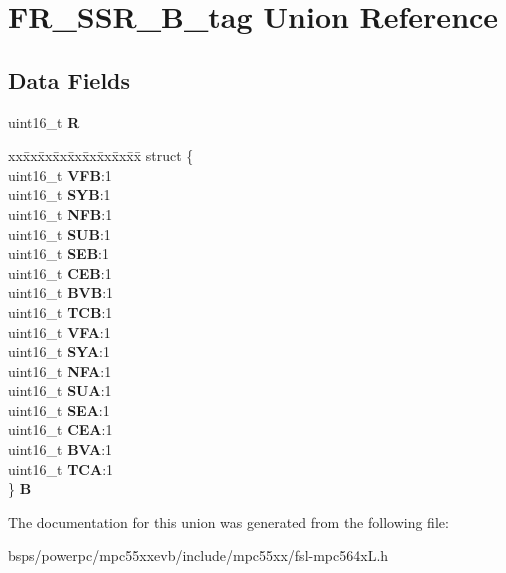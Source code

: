 \hypertarget{unionFR__SSR__16B__tag}{}\section{F\+R\+\_\+\+S\+S\+R\+\_\+B\+\_\+tag Union Reference}
\label{unionFR__SSR__16B__tag}
\subsection*{Data Fields}
\begin{DoxyCompactItemize}
\item 
\mbox{\label{unionFR__SSR__16B__tag_a00888d710880e02af1002a7a520a14ed}} 
uint16\+\_\+t {\bfseries R}
\item 
\mbox{\label{unionFR__SSR__16B__tag_a0a9411fcb2dc6e083cb123cf03e1525c}} 
\begin{tabbing}
xx\=xx\=xx\=xx\=xx\=xx\=xx\=xx\=xx\=\kill
struct \{\\
\>uint16\_t {\bfseries VFB}:1\\
\>uint16\_t {\bfseries SYB}:1\\
\>uint16\_t {\bfseries NFB}:1\\
\>uint16\_t {\bfseries SUB}:1\\
\>uint16\_t {\bfseries SEB}:1\\
\>uint16\_t {\bfseries CEB}:1\\
\>uint16\_t {\bfseries BVB}:1\\
\>uint16\_t {\bfseries TCB}:1\\
\>uint16\_t {\bfseries VFA}:1\\
\>uint16\_t {\bfseries SYA}:1\\
\>uint16\_t {\bfseries NFA}:1\\
\>uint16\_t {\bfseries SUA}:1\\
\>uint16\_t {\bfseries SEA}:1\\
\>uint16\_t {\bfseries CEA}:1\\
\>uint16\_t {\bfseries BVA}:1\\
\>uint16\_t {\bfseries TCA}:1\\
\} {\bfseries B}\\

\end{tabbing}\end{DoxyCompactItemize}


The documentation for this union was generated from the following file\+:\begin{DoxyCompactItemize}
\item 
bsps/powerpc/mpc55xxevb/include/mpc55xx/fsl-\/mpc564x\+L.\+h\end{DoxyCompactItemize}
